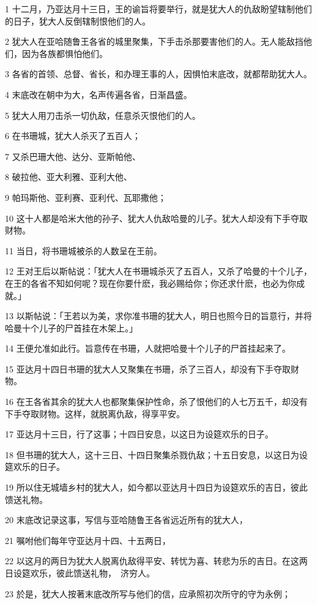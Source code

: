 \par 1 十二月，乃亚达月十三日，王的谕旨将要举行，就是犹大人的仇敌盼望辖制他们的日子，犹大人反倒辖制恨他们的人。
\par 2 犹大人在亚哈随鲁王各省的城里聚集，下手击杀那要害他们的人。无人能敌挡他们，因为各族都惧怕他们。
\par 3 各省的首领、总督、省长，和办理王事的人，因惧怕末底改，就都帮助犹大人。
\par 4 末底改在朝中为大，名声传遍各省，日渐昌盛。
\par 5 犹大人用刀击杀一切仇敌，任意杀灭恨他们的人。
\par 6 在书珊城，犹大人杀灭了五百人；
\par 7 又杀巴珊大他、达分、亚斯帕他、
\par 8 破拉他、亚大利雅、亚利大他、
\par 9 帕玛斯他、亚利赛、亚利代、瓦耶撒他；
\par 10 这十人都是哈米大他的孙子、犹大人仇敌哈曼的儿子。犹大人却没有下手夺取财物。
\par 11 当日，将书珊城被杀的人数呈在王前。
\par 12 王对王后以斯帖说：「犹大人在书珊城杀灭了五百人，又杀了哈曼的十个儿子，在王的各省不知如何呢？现在你要什麽，我必赐给你；你还求什麽，也必为你成就。」
\par 13 以斯帖说：「王若以为美，求你准书珊的犹大人，明日也照今日的旨意行，并将哈曼十个儿子的尸首挂在木架上。」
\par 14 王便允准如此行。旨意传在书珊，人就把哈曼十个儿子的尸首挂起来了。
\par 15 亚达月十四日书珊的犹大人又聚集在书珊，杀了三百人，却没有下手夺取财物。
\par 16 在王各省其余的犹大人也都聚集保护性命，杀了恨他们的人七万五千，却没有下手夺取财物。这样，就脱离仇敌，得享平安。
\par 17 亚达月十三日，行了这事；十四日安息，以这日为设筵欢乐的日子。
\par 18 但书珊的犹大人，这十三日、十四日聚集杀戮仇敌；十五日安息，以这日为设筵欢乐的日子。
\par 19 所以住无城墙乡村的犹大人，如今都以亚达月十四日为设筵欢乐的吉日，彼此馈送礼物。
\par 20 末底改记录这事，写信与亚哈随鲁王各省远近所有的犹大人，
\par 21 嘱咐他们每年守亚达月十四、十五两日，
\par 22 以这月的两日为犹大人脱离仇敌得平安、转忧为喜、转悲为乐的吉日。在这两日设筵欢乐，彼此馈送礼物，　济穷人。
\par 23 於是，犹大人按著末底改所写与他们的信，应承照初次所守的守为永例；
